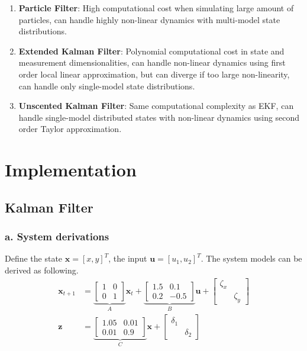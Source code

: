 \documentclass{article}
\theoremstyle{definition} %
\begin{document}
\begin{enumerate}[label=\alph*.]
    \item \textbf{Particle Filter}: High computational cost when simulating large amount of particles, can handle highly non-linear dynamics with multi-model state distributions.
    \item \textbf{Extended Kalman Filter}: Polynomial computational cost in state and measurement dimensionalities, can handle non-linear dynamics using first order local linear approximation, but can diverge if too large non-linearity, can handle only single-model state distributions.
    \item \textbf{Unscented Kalman Filter}: Same computational complexity as EKF, can handle single-model distributed states with non-linear dynamics using second order Taylor approximation.
\end{enumerate}


\section*{Implementation}

\subsection*{Kalman Filter}

\subsubsection*{a. System derivations}
Define the state $\mathbf{x} = [x, y]^T$, the input $\mathbf{u} = [u_1, u_2]^T$. The system models can be derived as following.
\begin{align*}
    \mathbf{x}_{t+1} &= 
    \underbrace{
    \begin{bmatrix}
        1 & 0 \\ 0 & 1
    \end{bmatrix}
    }_A
    \mathbf{x}_t + 
    \underbrace{
    \begin{bmatrix}
        1.5 & 0.1 \\ 0.2 & -0.5
    \end{bmatrix}
    }_B
    \mathbf{u} + 
    \begin{bmatrix}
        \zeta_x &\\&\zeta_y 
    \end{bmatrix}
    \\
    \mathbf{z} &= 
    \underbrace{
    \begin{bmatrix}
        1.05 & 0.01 \\ 0.01 & 0.9
    \end{bmatrix}}
    _C
    \mathbf{x} + 
    \begin{bmatrix}
        \delta_1 &\\&\delta_2
    \end{bmatrix}
\end{align*}
\end{document}

